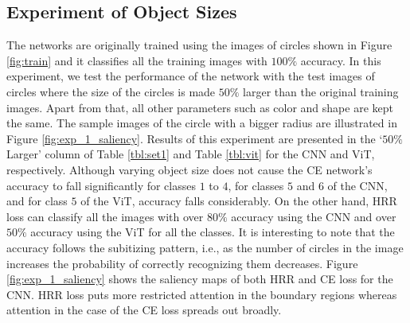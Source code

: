 \documentclass[letterpaper]{article} %
\begin{document}
\subsection{Experiment of Object Sizes}
The networks are originally trained using the images of circles shown in Figure \ref{fig:train} and it classifies all the training images with $100\%$ accuracy. In this experiment, we test the performance of the network with the test images of circles where the size of the circles is made $50\%$ larger than the original training images.  Apart from that, all other parameters such as color and shape are kept the same. The sample images of the circle with a bigger radius are illustrated in Figure \ref{fig:exp_1_saliency}. Results of this experiment are presented in the `$50\%$ Larger’ column of Table \ref{tbl:set1} and Table \ref{tbl:vit} for the CNN and ViT, respectively. Although varying object size does not cause the CE network’s accuracy to fall significantly for classes $1$ to $4$, for classes $5$ and $6$ of the CNN, and for class $5$ of the ViT, accuracy falls considerably. On the other hand, HRR loss can classify all the images with over $80\%$ accuracy using the CNN and over $50\%$ accuracy using the ViT for all the classes. It is interesting to note that the accuracy follows the subitizing pattern, i.e., as the number of circles in the image increases the probability of correctly recognizing them decreases. Figure \ref{fig:exp_1_saliency} shows the saliency maps of both HRR and CE loss for the CNN. HRR loss puts more restricted attention in the boundary regions whereas attention in the case of the CE loss spreads out broadly.
\end{document}
